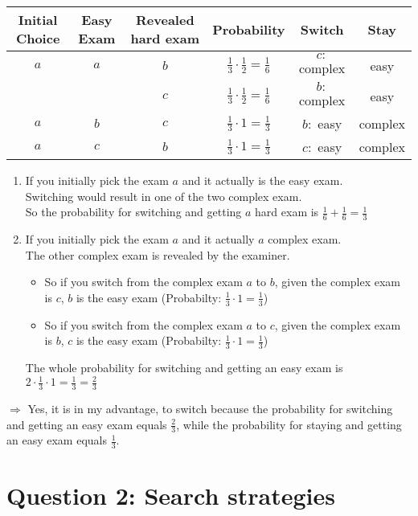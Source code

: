 \begin{table}[htbp]
\renewcommand{\arraystretch}{1.5}
\begin{tabular}{c | c | c | c | c | c}
Initial Choice & Easy Exam 	& Revealed hard exam	& Probability & Switch & Stay\\ \hline
$a$ & $a$			& $b$						& $\frac{1}{3} \cdot \frac{1}{2} = \frac{1}{6}$ & $c:$ complex & easy\\
~ &~			& $c$						& $\frac{1}{3} \cdot \frac{1}{2} = \frac{1}{6}$ & $b:$ complex & easy  \\ \hline
$a$ & $b$			& $c$						& $\frac{1}{3} \cdot 1 = \frac{1}{3}$ & $b:$ easy & complex\\
\hline
$a$ & $c$			& $b$						& $\frac{1}{3} \cdot 1 = \frac{1}{3}$ & $c:$ easy & complex
\end{tabular}
\end{table}
\begin{enumerate}
\item If you initially pick the exam $a$ and it actually is the easy exam. \\Switching would result in one of the two complex exam.\\
So the probability for switching and getting $a$ hard exam is $\frac{1}{6} + \frac{1}{6} = \frac{1}{3}$
\item If you initially pick the exam $a$ and it actually $a$ complex exam. \\The other complex exam is revealed by the examiner.
\begin{itemize}
	\item So if you switch from the complex exam $a$ to $b$, given the complex exam is $c$, $b$ is the easy exam (Probabilty: $\frac{1}{3} \cdot 1 = \frac{1}{3}$)
    \item So if you switch from the complex exam $a$ to $c$, given the complex exam is $b$, $c$ is the easy exam (Probabilty: $\frac{1}{3} \cdot 1 = \frac{1}{3}$)
\end{itemize}
The whole probability for switching and getting an easy exam is $2 \cdot \frac{1}{3} \cdot 1 = \frac{1}{3} = \frac{2}{3}$	\\
\end{enumerate}
$\Rightarrow$  Yes, it is in my advantage, to switch because the probability for switching and getting an easy exam equals $\frac{2}{3}$, while the probability for staying and getting an easy exam equals $\frac{1}{3}$.


\section*{Question 2: Search strategies}
